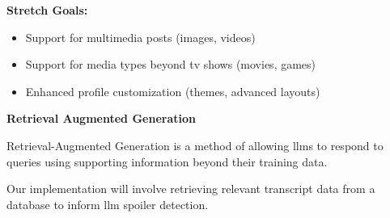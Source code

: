 \documentclass{homework}
\begin{document}
\bigskip

\textbf{Stretch Goals:}
\begin{itemize}
  \item Support for multimedia posts (images, videos)
  \item Support for media types beyond tv shows (movies, games)
  \item Enhanced profile customization (themes, advanced layouts)
\end{itemize}

\bigskip

\label{explanation} \textbf{Retrieval Augmented Generation}

Retrieval-Augmented Generation is a method of allowing llms to respond to queries using supporting information beyond their training data. 

Our implementation will involve retrieving relevant transcript data from a database to inform llm spoiler detection.

% 
% 
\end{document}
